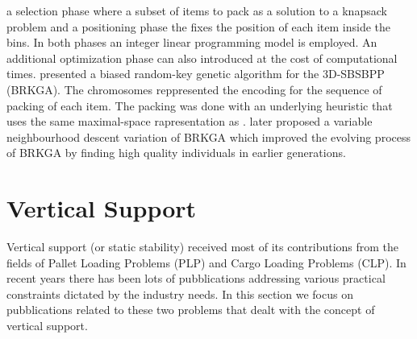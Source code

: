 a selection phase where a subset of items to pack as a solution to a knapsack problem and a positioning phase the fixes the position of each item inside the bins.
In both phases an integer linear programming model is employed. An additional optimization phase can also introduced at the cost of computational times.
\cite{gonccalves2013biased} presented a biased random-key genetic algorithm for the 3D-SBSBPP (BRKGA).
The chromosomes reppresented the encoding for the sequence of packing of each item.
The packing was done with an underlying heuristic that uses the same maximal-space rapresentation as \citet{parreno2010hybrid}.
\cite{zudio2018brkga} later proposed a variable neighbourhood descent variation of BRKGA which improved the evolving process of BRKGA by finding high quality individuals in earlier generations.


\section{Vertical Support}
\label{sec:literature:support}%
Vertical support (or static stability) received most of its contributions from the fields of Pallet Loading Problems (PLP) and Cargo Loading Problems (CLP).
In recent years there has been lots of pubblications addressing various practical constraints dictated by the industry needs.
In this section we focus on pubblications related to these two problems that dealt with the concept of vertical support.

